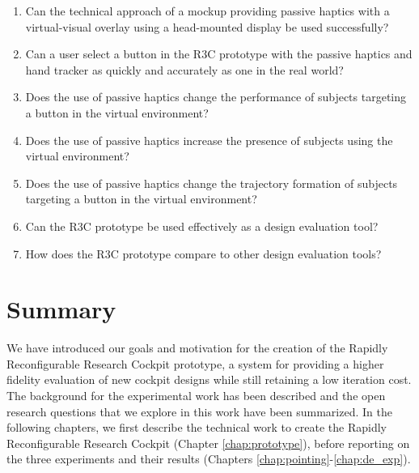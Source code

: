 \begin{enumerate}
    \item Can the technical approach of a mockup providing passive haptics with a virtual-visual overlay using a head-mounted display be used successfully?
    \item Can a user select a button in the R3C prototype with the passive haptics and hand tracker as quickly and accurately as one in the real world?
    \item Does the use of passive haptics change the performance of subjects targeting a button in the virtual environment?
    \item Does the use of passive haptics increase the presence of subjects using the virtual environment?
    \item Does the use of passive haptics change the trajectory formation of subjects targeting a button in the virtual environment?
    \item Can the R3C prototype be used effectively as a design evaluation tool?
    \item How does the R3C prototype compare to other design evaluation tools?
\end{enumerate}

\section{Summary}

We have introduced our goals and motivation for the creation of the Rapidly Reconfigurable Research Cockpit prototype, a system for providing a higher fidelity evaluation of new cockpit designs while still retaining a low iteration cost.
The background for the experimental work has been described and the open research questions that we explore in this work have been summarized.
In the following chapters, we first describe the technical work to create the Rapidly Reconfigurable Research Cockpit (Chapter \ref{chap:prototype}), before reporting on the three experiments and their results (Chapters \ref{chap:pointing}-\ref{chap:de_exp}).
